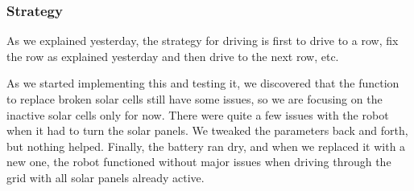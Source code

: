\subsubsection{Strategy}

As we explained yesterday, the strategy for driving is first to drive to a
row, fix the row as explained yesterday and then drive to the next row,
etc.

As we started implementing this and testing it, we discovered that the
function to replace broken solar cells still have some issues, so we are
focusing on the inactive solar cells only for now. There were quite a
few issues with the robot when it had to turn the solar panels. We
tweaked the parameters back and forth, but nothing helped. Finally, the
battery ran dry, and when we replaced it with a new one, the robot
functioned without major issues when driving through the grid with all
solar panels already active.
